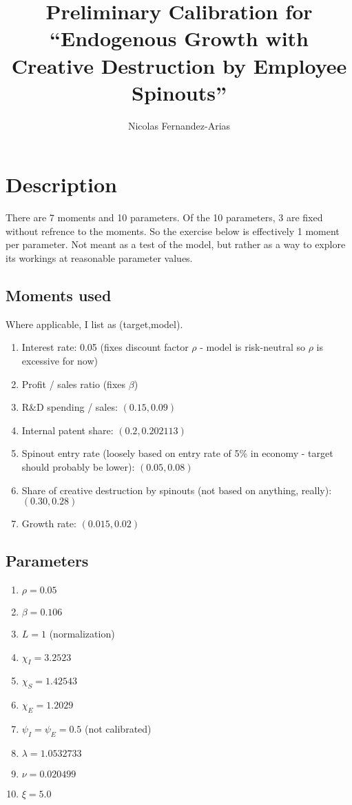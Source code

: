\documentclass[12pt,english]{article}
\theoremstyle{remark}
\begin{document}
	
\title{Preliminary Calibration for ``Endogenous Growth with Creative Destruction by Employee Spinouts''}
\author{Nicolas Fernandez-Arias}
\maketitle

\section{Description}

There are 7 moments and 10 parameters. Of the 10 parameters, 3 are fixed without refrence to the moments. So the exercise below is effectively 1 moment per parameter. Not meant as a test of the model, but rather as a way to explore its workings at reasonable parameter values.

\subsection{Moments used}

Where applicable, I list as (target,model).

\begin{enumerate}
	\item Interest rate: 0.05 (fixes discount factor $\rho$ - model is risk-neutral so $\rho$ is excessive for now)
	\item Profit / sales ratio (fixes $\beta$)
	\item R\&D spending / sales: $(0.15,0.09)$
	\item Internal patent share: $(0.2,0.202113)$
	\item Spinout entry rate (loosely based on entry rate of 5\% in economy - target should probably be lower): $(0.05,0.08)$
	\item Share of creative destruction by spinouts (not based on anything, really): $(0.30,0.28)$
	\item Growth rate: $(0.015, 0.02)$
\end{enumerate}

\subsection{Parameters}
\begin{enumerate}
	\item $\rho = 0.05$
	\item $\beta = 0.106$
	\item $L = 1$ (normalization)
	\item $\chi_I = 3.2523$
	\item $\chi_S = 1.42543$
	\item $\chi_E = 1.2029$
	\item $\psi_I = \psi_E = 0.5$ (not calibrated)
	\item $\lambda = 1.0532733$
	\item $\nu = 0.020499$
	\item $\xi = 5.0$
\end{enumerate}
\end{document}
